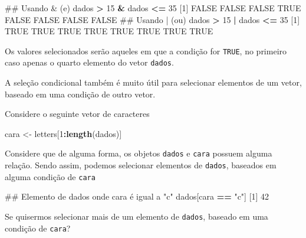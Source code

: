 \documentclass[10pt,a4paper]{book}
\newenvironment{Shaded}{\begin{snugshade}}{\end{snugshade}}
\newcommand{\KeywordTok}[1]{\textcolor[rgb]{0.13,0.29,0.53}{\textbf{#1}}}
\newcommand{\DecValTok}[1]{\textcolor[rgb]{0.00,0.00,0.81}{#1}}
\newcommand{\StringTok}[1]{\textcolor[rgb]{0.31,0.60,0.02}{#1}}
\newcommand{\OtherTok}[1]{\textcolor[rgb]{0.56,0.35,0.01}{#1}}
\newcommand{\OperatorTok}[1]{\textcolor[rgb]{0.81,0.36,0.00}{\textbf{#1}}}
\newcommand{\NormalTok}[1]{#1}
\begin{document}
\begin{Shaded}
\begin{Highlighting}[]
\NormalTok{## Usando & (e)}
\NormalTok{dados }\OperatorTok{>}\StringTok{ }\DecValTok{15} \OperatorTok{&}\StringTok{ }\NormalTok{dados }\OperatorTok{<=}\StringTok{ }\DecValTok{35}
\NormalTok{[}\DecValTok{1}\NormalTok{] }\OtherTok{FALSE} \OtherTok{FALSE} \OtherTok{FALSE}  \OtherTok{TRUE} \OtherTok{FALSE} \OtherTok{FALSE} \OtherTok{FALSE} \OtherTok{FALSE}
\NormalTok{## Usando | (ou)}
\NormalTok{dados }\OperatorTok{>}\StringTok{ }\DecValTok{15} \OperatorTok{|}\StringTok{ }\NormalTok{dados }\OperatorTok{<=}\StringTok{ }\DecValTok{35}
\NormalTok{[}\DecValTok{1}\NormalTok{] }\OtherTok{TRUE} \OtherTok{TRUE} \OtherTok{TRUE} \OtherTok{TRUE} \OtherTok{TRUE} \OtherTok{TRUE} \OtherTok{TRUE} \OtherTok{TRUE}
\end{Highlighting}
\end{Shaded}

Os valores selecionados serão aqueles em que a condição for
\texttt{TRUE}, no primeiro caso apenas o quarto elemento do vetor
\texttt{dados}.

A seleção condicional também é muito útil para selecionar elementos de
um vetor, baseado em uma condição de outro vetor.

Considere o seguinte vetor de caracteres

\begin{Shaded}
\begin{Highlighting}[]
\NormalTok{cara <-}\StringTok{ }\NormalTok{letters[}\DecValTok{1}\OperatorTok{:}\KeywordTok{length}\NormalTok{(dados)]}
\end{Highlighting}
\end{Shaded}

Considere que de alguma forma, os objetos \texttt{dados} e \texttt{cara}
possuem alguma relação. Sendo assim, podemos selecionar elementos de
\texttt{dados}, baseados em alguma condição de \texttt{cara}

\begin{Shaded}
\begin{Highlighting}[]
\NormalTok{## Elemento de dados onde cara é igual a "c"}
\NormalTok{dados[cara }\OperatorTok{==}\StringTok{ "c"}\NormalTok{]}
\NormalTok{[}\DecValTok{1}\NormalTok{] }\DecValTok{42}
\end{Highlighting}
\end{Shaded}

Se quisermos selecionar mais de um elemento de \texttt{dados}, baseado
em uma condição de \texttt{cara}?
\end{document}
